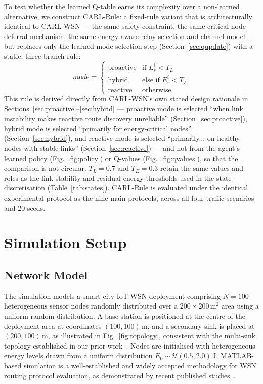\documentclass[12pt]{article}
\begin{document}
To test whether the learned Q-table earns its complexity over a
non-learned alternative, we construct CARL-Rule: a fixed-rule variant
that is architecturally identical to CARL-WSN --- the same safety
constraint, the same critical-node deferral mechanism, the same
energy-aware relay selection and channel model --- but replaces only
the learned mode-selection step (Section~\ref{sec:qupdate}) with a static,
three-branch rule:
\begin{equation}
mode =
\begin{cases}
\text{proactive} & \text{if } L_s^i < T_L \\
\text{hybrid} & \text{else if } E_r^i < T_E \\
\text{reactive} & \text{otherwise}
\end{cases}
\label{eq:rule_ablation}
\end{equation}
This rule is derived directly from CARL-WSN's own stated design
rationale in Sections~\ref{sec:proactive}--\ref{sec:hybrid} ---
proactive mode is selected ``when link instability makes reactive
route discovery unreliable'' (Section~\ref{sec:proactive}), hybrid
mode is selected ``primarily for energy-critical nodes''
(Section~\ref{sec:hybrid}), and reactive mode is selected
``primarily... on healthy nodes with stable links''
(Section~\ref{sec:reactive}) --- and not from the agent's learned policy
(Fig.~\ref{fig:policy}) or Q-values (Fig.~\ref{fig:qvalues}), so that
the comparison is not circular. $T_L = 0.7$ and $T_E = 0.3$ retain
the same values and roles as the link-stability and residual-energy
thresholds used in the state discretisation (Table~\ref{tab:states}).
CARL-Rule is evaluated under the identical experimental protocol as
the nine main protocols, across all four traffic scenarios and 20
seeds.

\section{Simulation Setup}
\label{sec:simulation}

\subsection{Network Model}

The simulation models a smart city IoT-WSN deployment comprising
$N = 100$ heterogeneous sensor nodes randomly distributed over a
$200 \times 200$\,m$^2$ area using a uniform random distribution.
A base station is positioned at the centre of the deployment area
at coordinates $(100, 100)$\,m, and a secondary sink is placed at
$(200, 100)$\,m, as illustrated in Fig.~\ref{fig:topology},
consistent with the multi-sink topology established in our prior
work~\cite{salman2023}. Nodes are initialised with heterogeneous
energy levels drawn from a uniform distribution
$E_0 \sim \mathcal{U}(0.5, 2.0)$\,J. MATLAB-based simulation is a
well-established and widely accepted methodology for WSN routing
protocol evaluation, as demonstrated by recent published
studies~\cite{priyadarshi_ai-based_2025,daanoune_intelligent_2026,lbeer2025}.
\end{document}
